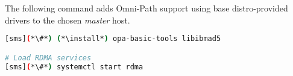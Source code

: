 The following command adds Omni-Path support using base distro-provided drivers
to the chosen {\em master} host.

\begin{lstlisting}[language=bash,keywords={}]
[sms](*\#*) (*\install*) opa-basic-tools libibmad5

# Load RDMA services
[sms](*\#*) systemctl start rdma
\end{lstlisting}



